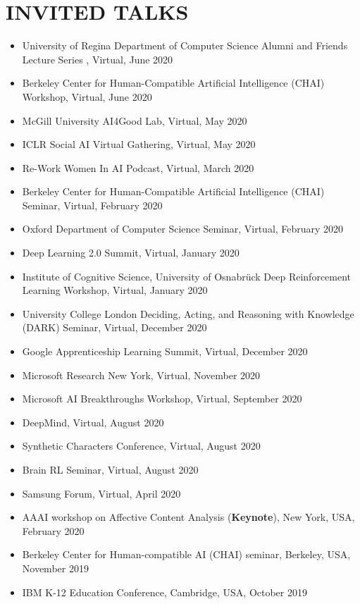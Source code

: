 \documentclass[paper=letter,fontsize=11pt]{scrartcl} %
\newcommand{\NewPart}[2]{\section*{\uppercase{#1} #2}}
\newcommand{\TalkEntry}[4]{
		\noindent #1, #2, #3 #4}
\begin{document}
\NewPart{Invited Talks}{}
\begin{itemize}
\item\TalkEntry{University of Regina Department of Computer Science Alumni and Friends Lecture Series }{Virtual}{June 2020}{}
\item\TalkEntry{Berkeley Center for Human-Compatible Artificial Intelligence (CHAI) Workshop}{Virtual}{June 2020}{}
\item\TalkEntry{McGill University AI4Good Lab}{Virtual}{May 2020}{}
\item\TalkEntry{ICLR Social AI Virtual Gathering}{Virtual}{May 2020}{}
\item\TalkEntry{Re-Work Women In AI Podcast}{Virtual}{March 2020}{}
\item\TalkEntry{Berkeley Center for Human-Compatible Artificial Intelligence (CHAI) Seminar}{Virtual}{February 2020}{}
\item\TalkEntry{Oxford Department of Computer Science Seminar}{Virtual}{February 2020}{}
\item\TalkEntry{Deep Learning 2.0 Summit}{Virtual}{January 2020}{}
\item\TalkEntry{Institute of Cognitive Science, University of Osnabrück Deep Reinforcement Learning Workshop}{Virtual}{January 2020}{}
\item\TalkEntry{University College London Deciding, Acting, and Reasoning with Knowledge (DARK) Seminar}{Virtual}{December 2020}{}
\item\TalkEntry{Google Apprenticeship Learning Summit}{Virtual}{December 2020}{}
\item\TalkEntry{Microsoft Research New York}{Virtual}{November 2020}{}
\item\TalkEntry{Microsoft AI Breakthroughs Workshop}{Virtual}{September 2020}{}
\item\TalkEntry{DeepMind}{Virtual}{August 2020}{}
\item\TalkEntry{Synthetic Characters Conference}{Virtual}{August 2020}{} 
\item\TalkEntry{Brain RL Seminar}{Virtual}{August 2020}{} 
\item\TalkEntry{Samsung Forum}{Virtual}{April 2020}{} 
\item\TalkEntry{AAAI workshop on Affective Content Analysis (\textbf{Keynote})}{New York, USA}{February 2020}{} 
\item\TalkEntry{Berkeley Center for Human-compatible AI (CHAI) seminar}{Berkeley, USA}{November 2019}{} 
\item\TalkEntry{IBM K-12 Education Conference}{Cambridge, USA}{October 2019}{} 

\end{itemize}
\end{document}
